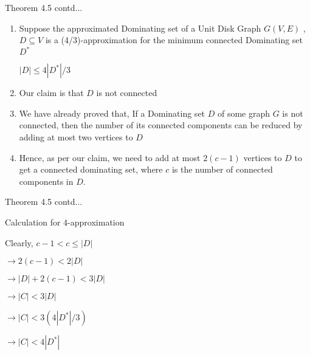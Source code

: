 \documentclass{beamer}
\begin{document}
\begin{frame}{Theorem 4.5 contd...}

\begin{enumerate}

    \item Suppose the approximated Dominating set of a Unit Disk Graph $G(V,E)$ , $D \subseteq V$ is a (4/3)-approximation for the minimum connected Dominating set $D^*$


    $ |D| \le 4|D^*|/3$

    \item Our claim is that $D$ is not connected

    \item We have already proved that, If a Dominating set $D$ of some graph $G$ is not connected, then the number of its connected components can be reduced by adding at most two vertices to $D$

    \item Hence, as per our claim, we need to add at most $2(c -1)$ vertices to $D$ to get a connected dominating set, where $c$ is the number of connected components in $D$.
    
\end{enumerate}




\end{frame}

\begin{frame}{Theorem 4.5 contd...}

\begin{exampleblock}{Calculation for 4-approximation}

    Clearly, 
    $c-1 < c \le |D|$

    \vspace{5mm}
    
    $\xrightarrow{} 2(c-1) < 2|D|$

    \vspace{5mm}

    $\xrightarrow{} |D| + 2(c-1) < 3|D|$

    \vspace{5mm}

    $\xrightarrow{} |C| < 3|D|$

    \vspace{5mm}

    $\xrightarrow{} |C| < 3 ( 4|D^*|/3 )$

    \vspace{5mm}

    $\xrightarrow{} |C| < 4|D^*|$

\end{exampleblock}
    
\end{frame}
\end{document}
